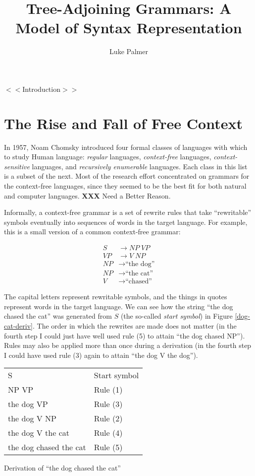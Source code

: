 \documentclass[12pt]{article}
\title{Tree-Adjoining Grammars: A Model of Syntax Representation}
\author{Luke Palmer}
\begin{document}
\maketitle
\doublespace

$<<$Introduction$>>$

\section{The Rise and Fall of Free Context}

In 1957, Noam Chomsky introduced four formal classes of languages with
which to study Human language:  \textit{regular} languages,
\textit{context-free} languages, \textit{context-sensitive} languages,
and \textit{recursively enumerable} languages.  Each class in this list
is a subset of the next.  Most of the research effort concentrated on
grammars for the context-free languages, since they seemed to be the
best fit for both natural and computer languages. \textbf{XXX} Need a
Better Reason.

Informally, a context-free grammar is a set of rewrite rules that take
``rewritable'' symbols eventually into sequences of words in the target
language.  For example, this is a small version of a common context-free
grammar:

\begin{align}
S  &\rightarrow \mathit{NP} \; \mathit{VP}      \tag{1} \\
\mathit{VP} &\rightarrow V \; \mathit{NP}       \tag{2} \\
\mathit{NP} &\rightarrow \text{``the dog''}     \tag{3} \\
\mathit{NP} &\rightarrow \text{``the cat''}     \tag{4} \\
V  &\rightarrow \text{``chased''}               \tag{5}
\end{align}

The capital letters represent rewritable symbols, and the things in
quotes represent words in the target language.  We can see how the
string ``the dog chased the cat'' was generated from $S$ (the so-called
\textit{start symbol}) in Figure \ref{dog-cat-deriv}.  The order in
which the rewrites are made does not matter (in the fourth step I could
just have well used rule (5) to attain ``the dog chased NP'').  Rules may
also be applied more than once during a derivation (in the fourth step I
could have used rule (3) again to attain ``the dog V the dog'').

\begin{Figure}
\begin{tabularx}{\linewidth}{X|X}
S                      & Start symbol \\
NP VP                  & Rule (1) \\
the dog VP             & Rule (3) \\
the dog V NP           & Rule (2) \\
the dog V the cat      & Rule (4) \\
the dog chased the cat & Rule (5) \\
\end{tabularx}
\caption{Derivation of ``the dog chased the cat''}
\label{dog-cat-deriv}
\end{Figure}
\end{document}

